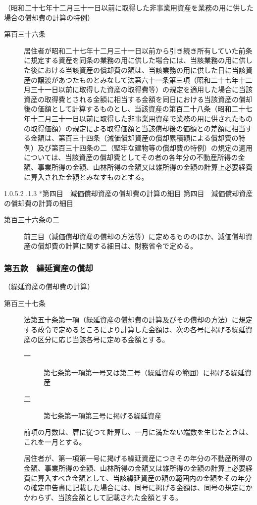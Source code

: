 \documentclass[twocolumn,a4j,10pt]{ltjtarticle}
\makeatletter
\newcommand{\subsubsubsection}{\@startsection{paragraph}{4}{\z@}%
  {1.0\Cvs \@plus.5\Cdp \@minus.2\Cdp}%
  {.1\Cvs \@plus.3\Cdp}%
  {\reset@font\sffamily\normalsize}
}
\makeatother
\begin{document}
\noindent\hspace{10pt}（昭和二十七年十二月三十一日以前に取得した非事業用資産を業務の用に供した場合の償却費の計算の特例）
\begin{description}
\item[第百三十六条]居住者が昭和二十七年十二月三十一日以前から引き続き所有していた前条に規定する資産を同条の業務の用に供した場合には、当該業務の用に供した後における当該資産の償却費の額は、当該業務の用に供した日に当該資産の譲渡があつたものとみなして法第六十一条第三項（昭和二十七年十二月三十一日以前に取得した資産の取得費等）の規定を適用した場合に当該資産の取得費とされる金額に相当する金額を同日における当該資産の償却後の価額として計算するものとし、当該資産の第百二十八条（昭和二十七年十二月三十一日以前に取得した非事業用資産で業務の用に供されたものの取得価額）の規定による取得価額と当該償却後の価額との差額に相当する金額は、第百三十四条（減価償却資産の償却累積額による償却費の特例）及び第百三十四条の二（堅牢な建物等の償却費の特例）の規定の適用については、当該資産の償却費としてその者の各年分の不動産所得の金額、事業所得の金額、山林所得の金額又は雑所得の金額の計算上必要経費に算入された金額とみなすものとする。
\end{description}
\subsubsubsection*{第四目　減価償却資産の償却費の計算の細目}
{第四目　減価償却資産の償却費の計算の細目}
\begin{description}
\item[第百三十六条の二]前三目（減価償却資産の償却の方法等）に定めるもののほか、減価償却資産の償却費の計算に関する細目は、財務省令で定める。
\end{description}
\subsubsection*{第五款　繰延資産の償却}
\noindent\hspace{10pt}（繰延資産の償却費の計算）
\begin{description}
\item[第百三十七条]法第五十条第一項（繰延資産の償却費の計算及びその償却の方法）に規定する政令で定めるところにより計算した金額は、次の各号に掲げる繰延資産の区分に応じ当該各号に定める金額とする。
\begin{description}
\item[一]第七条第一項第一号又は第二号（繰延資産の範囲）に掲げる繰延資産
\item[二]第七条第一項第三号に掲げる繰延資産
\end{description}
\item[]前項の月数は、暦に従つて計算し、一月に満たない端数を生じたときは、これを一月とする。
\item[]居住者が、第一項第一号に掲げる繰延資産につきその年分の不動産所得の金額、事業所得の金額、山林所得の金額又は雑所得の金額の計算上必要経費に算入すべき金額として、当該繰延資産の額の範囲内の金額をその年分の確定申告書に記載した場合には、同号に掲げる金額は、同号の規定にかかわらず、当該金額として記載された金額とする。
\end{description}
\end{document}
